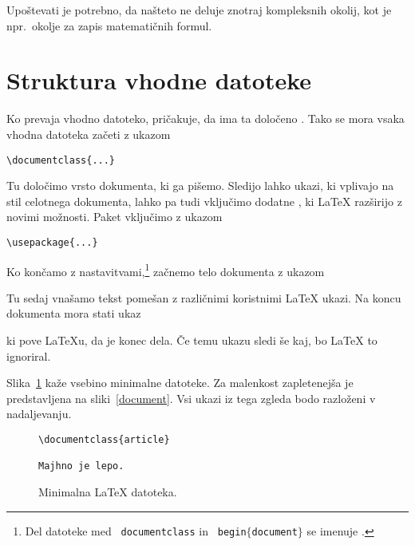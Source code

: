 Upoštevati je potrebno, da našteto ne deluje znotraj kompleksnih okolij, kot je 
npr.~okolje za zapis matematičnih formul.

\section{Struktura vhodne datoteke}

Ko \LaTeXe{} prevaja vhodno datoteko, pričakuje, da ima ta določeno .
Tako se mora vsaka vhodna datoteka začeti z ukazom
\begin{code}
\verb|\documentclass{...}|
\end{code}
Tu določimo vrsto dokumenta, ki ga pišemo. Sledijo lahko ukazi, ki vplivajo na stil
celotnega dokumenta, lahko pa tudi vključimo dodatne , ki \LaTeX{} razširijo
z novimi možnosti. Paket vključimo z ukazom 
\begin{code}
\verb|\usepackage{...}|
\end{code}

Ko končamo z nastavitvami,\footnote{Del datoteke med \texttt{\bs
    documentclass} in \texttt{\bs
    begin$\mathtt{\{}$document$\mathtt{\}}$} se imenuje
  \emph{}.} začnemo telo dokumenta z ukazom

\begin{code}
\verb||
\end{code}

Tu sedaj vnašamo tekst pomešan z različnimi koristnimi \LaTeX{} ukazi. Na koncu 
dokumenta mora stati ukaz
\begin{code}
\verb||
\end{code}
ki pove \LaTeX{}u, da je konec dela. Če temu ukazu sledi še kaj,
bo \LaTeX{} to ignoriral.

Slika~\ref{mini} kaže vsebino minimalne \LaTeXe{} datoteke. Za malenkost
zapletenejša  je predstavljena na sliki~\ref{document}.
 Vsi ukazi iz
tega zgleda bodo razloženi v nadaljevanju.

\begin{figure}[!bp]
\begin{lined}{6cm}
\begin{verbatim}
\documentclass{article}

Majhno je lepo.

\end{verbatim}
\end{lined}
\caption{Minimalna \LaTeX{} datoteka.} \label{mini}
\end{figure}
 
